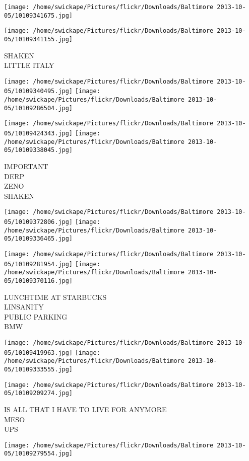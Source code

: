 \documentclass[10pt,letterpaper]{article}
\begin{document}
\texttt{[image: /home/swickape/Pictures/flickr/Downloads/Baltimore 2013-10-05/10109341675.jpg]}

\vspace{0.25in}
\texttt{[image: /home/swickape/Pictures/flickr/Downloads/Baltimore 2013-10-05/10109341155.jpg]}

SHAKEN\\
LITTLE ITALY
\pagebreak

\texttt{[image: /home/swickape/Pictures/flickr/Downloads/Baltimore 2013-10-05/10109340495.jpg]}
\texttt{[image: /home/swickape/Pictures/flickr/Downloads/Baltimore 2013-10-05/10109286504.jpg]}

\texttt{[image: /home/swickape/Pictures/flickr/Downloads/Baltimore 2013-10-05/10109424343.jpg]}
\texttt{[image: /home/swickape/Pictures/flickr/Downloads/Baltimore 2013-10-05/10109338045.jpg]}

IMPORTANT\\
DERP\\
ZENO\\
SHAKEN
\pagebreak

\texttt{[image: /home/swickape/Pictures/flickr/Downloads/Baltimore 2013-10-05/10109372806.jpg]}
\texttt{[image: /home/swickape/Pictures/flickr/Downloads/Baltimore 2013-10-05/10109336465.jpg]}

\texttt{[image: /home/swickape/Pictures/flickr/Downloads/Baltimore 2013-10-05/10109281954.jpg]}
\texttt{[image: /home/swickape/Pictures/flickr/Downloads/Baltimore 2013-10-05/10109370116.jpg]}

LUNCHTIME AT STARBUCKS\\
LINSANITY\\
PUBLIC PARKING\\
BMW
\pagebreak

\texttt{[image: /home/swickape/Pictures/flickr/Downloads/Baltimore 2013-10-05/10109419963.jpg]}
\texttt{[image: /home/swickape/Pictures/flickr/Downloads/Baltimore 2013-10-05/10109333555.jpg]}

\texttt{[image: /home/swickape/Pictures/flickr/Downloads/Baltimore 2013-10-05/10109209274.jpg]}

IS ALL THAT I HAVE TO LIVE FOR ANYMORE\\
MESO\\
UPS
\pagebreak

\texttt{[image: /home/swickape/Pictures/flickr/Downloads/Baltimore 2013-10-05/10109279554.jpg]}
\end{document}
